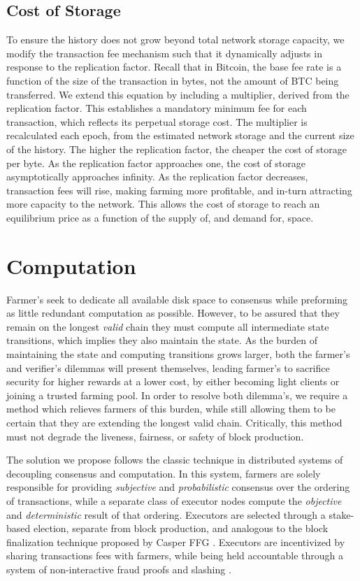 \documentclass[conference]{IEEEtran}
\begin{document}
\subsection{Cost of Storage}

To ensure the history does not grow beyond total network storage capacity, we modify the transaction fee mechanism such that it dynamically adjusts in response to the replication factor. Recall that in Bitcoin, the base fee rate is a function of the size of the transaction in bytes, not the amount of BTC being transferred. We extend this equation by including a multiplier, derived from the replication factor. This establishes a mandatory minimum fee for each transaction, which reflects its perpetual storage cost. The multiplier is recalculated each epoch, from the estimated network storage and the current size of the history. The higher the replication factor, the cheaper the cost of storage per byte. As the replication factor approaches one, the cost of storage asymptotically approaches infinity. As the replication factor decreases, transaction fees will rise, making farming more profitable, and in-turn attracting more capacity to the network. This allows the cost of storage to reach an equilibrium price as a function of the supply of, and demand for, space.  


\section{Computation}

Farmer’s seek to dedicate all available disk space to consensus while preforming as little redundant computation as possible. However, to be assured that they remain on the longest \textit{valid} chain they must compute all intermediate state transitions, which implies they also maintain the state. As the burden of maintaining the state and computing transitions grows larger, both the farmer’s and verifier’s dilemmas will present themselves, leading farmer’s to sacrifice security for higher rewards at a lower cost, by either becoming light clients or joining a trusted farming pool. In order to resolve both dilemma’s, we require a method which relieves farmers of this burden, while still allowing them to be certain that they are extending the longest valid chain. Critically, this method must not degrade the liveness, fairness, or safety of block production.

The solution we propose follows the classic technique in distributed systems of decoupling consensus and computation. In this system, farmers are solely responsible for providing \textit{subjective} and \textit{probabilistic} consensus over the ordering of transactions, while a separate class of executor nodes  compute the \textit{objective} and \textit{deterministic} result of that ordering. Executors are selected through a stake-based election, separate from block production, and analogous to the block finalization technique proposed by Casper FFG \cite{buterin2017casper}. Executors are incentivized by sharing transactions fees with farmers, while being held accountable through a system of non-interactive fraud proofs \cite{al2018fraud} and slashing \cite{buterin_2014}. 
\end{document}
